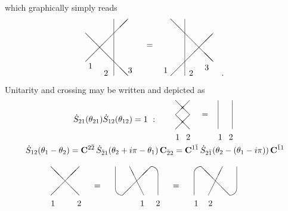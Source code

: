 \documentclass[a4paper,a4paper]{article}
\begin{document}
which graphically simply reads 
\[
\begin{array}{c}
\unitlength6mm\begin{picture}(9,4) \put(0,1){\line(1,1){3}}
\put(0,3){\line(1,-1){3}} \put(2,0){\line(0,1){4}} \put(4.3,2){$=$}
\put(6,0){\line(1,1){3}} \put(6,4){\line(1,-1){3}} \put(7,0){\line(0,1){4}}
\put(.2,.5){$1$} \put(1.3,0){$2$} \put(3,.2){$3$} \put(5.5,.2){$1$}
\put(7.3,0){$2$} \put(8.4,.4){$3$} \end{picture}~~~.
\end{array}
\]
Unitarity and crossing may be written and depicted as 
\begin{equation}
\dot{S}_{21}(\theta _{21})\dot{S}_{12}(\theta _{12})=1~:~~~~~ 
\begin{array}{c}
\unitlength3mm\begin{picture}(8,5) \put(0,1){\line(1,1){2}}
\put(2,1){\line(-1,1){2}} \put(0,3){\line(1,1){2}} \put(2,3){\line(-1,1){2}}
\put(6,1){\line(0,1){4}} \put(8,1){\line(0,1){4}} \put(3.7,2.7){$=$}
\put(0,-.5){$1$} \put(1.5,-.5){$2$} \put(6,-.5){$1$} \put(7.5,-.5){$2$}
\end{picture}
\end{array}
\label{1.8}
\end{equation}
\begin{gather}
\dot{S}_{12}(\theta _{1}-\theta _{2})=\mathbf{C}^{2\bar{2}}\,\dot{S}_{\bar{2}%
1}(\theta _{2}+i\pi -\theta _{1})\,\mathbf{C}_{\bar{2}2}=\mathbf{C}^{1\bar{1}%
}\,\dot{S}_{2\bar{1}}(\theta _{2}-(\theta _{1}-i\pi ))\,\mathbf{C}^{\bar{1}1}
\label{1.9} \\[0.12in]
\begin{array}{c}
\unitlength3mm\begin{picture}(4,5) \put(0,1){\line(1,1){4}}
\put(4,1){\line(-1,1){4}} \put(0,-.5){$1$} \put(3.7,-.5){$2$} \end{picture}
\end{array}
\quad =\quad 
\begin{array}{c}
\unitlength3mm\begin{picture}(6,5) \put(1,1){\line(1,1){4}}
\put(4,1){\line(-1,2){2}} \put(1,5){\oval(2,8)[lb]}
\put(5,1){\oval(2,8)[tr]} \put(3.5,-.5){$1$} \put(5.7,-.5){$2$} \end{picture}
\end{array}
\quad =\quad 
\begin{array}{c}
\unitlength3mm\begin{picture}(6,5) \put(2,1){\line(1,2){2}}
\put(5,1){\line(-1,1){4}} \put(1,1){\oval(2,8)[lt]}
\put(5,5){\oval(2,8)[br]} \put(0,-.5){$1$} \put(2,-.5){$2$} \end{picture}
\end{array}
~~~~~~~~  \nonumber
\end{gather}
\end{document}
